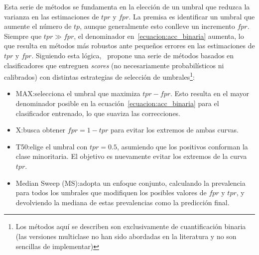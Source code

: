 Esta serie de métodos se fundamenta en la elección de un umbral que reduzca la
varianza en las estimaciones de \(tpr\) y \(fpr\). La premisa es identificar un
umbral que aumente el número de \(tp\), aunque generalmente esto conlleve un
incremento \(fpr\). Siempre que \(tpr \gg fpr\), el denominador
en~\ref{ecuacion:acc_binaria} aumenta, lo que resulta en métodos más robustos
ante pequeños errores en las estimaciones de \(tpr\) y \(fpr\). Siguiendo esta
lógica,~\citet{forman2006quantifying, forman2008quantifying} propone una serie
de métodos basados en clasificadores que entreguen {\it scores\/} (no
necesariamente probabilísticos ni calibrados) con distintas estrategias de
selección de umbrales\footnote{Los métodos aquí se describen son exclusivamente
de cuantificación binaria (las versiones multiclase no han sido abordadas en la
literatura y no son sencillas de implementar)}:

\begin{itemize}
    \item MAX:\@ selecciona el umbral que maximiza \(tpr-fpr\). Esto resulta en
    el mayor denominador posible en la ecuación~\ref{ecuacion:acc_binaria} para
    el clasificador entrenado, lo que suaviza las correcciones.
    \item X:\@ busca obtener \(fpr=1-tpr\) para evitar los extremos de ambas
    curvas.
    \item T50:\@ elige el umbral con \(tpr=0.5\), asumiendo que los positivos
    conforman la clase minoritaria. El objetivo es nuevamente evitar los
    extremos de la curva \(tpr\).
    \item Median Sweep (MS):\@ adopta un enfoque conjunto, calculando la
    prevalencia para todos los umbrales que modifiquen los posibles valores de
    \(fpr\) y \(tpr\), y devolviendo la mediana de estas prevalencias como la
    predicción final.
\end{itemize}

